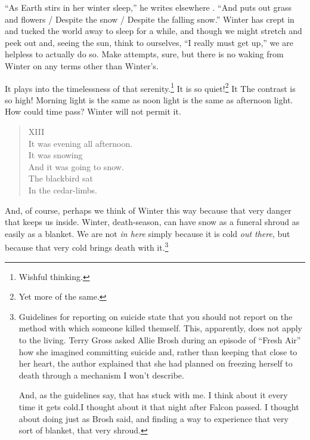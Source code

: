\documentclass[12pt,oneside]{memoir}
\begin{document}
``As Earth stirs in her winter sleep,'' he writes elsewhere \parencite[173]{graves_poems}. ``And puts out grass and flowers / Despite the snow / Despite the falling snow.'' Winter has crept in and tucked the world away to sleep for a while, and though we might stretch and peek out and, seeing the sun, think to ourselves, ``I really must get up,'' we are helpless to actually do so. Make attempts, sure, but there is no waking from Winter on any terms other than Winter's.

It plays into the timelessness of that serenity.\footnote{Wishful thinking.} It is so quiet!\footnote{Yet more of the same.} It The contrast is so high! Morning light is the same as noon light is the same as afternoon light. How could time pass? Winter will not permit it.

\begin{verse}
XIII \\
It was evening all afternoon. \\
It was snowing \\
And it was going to snow. \\
The blackbird sat \\
In the cedar-limbs.

\parencite{blackbird}
\end{verse}

And, of course, perhaps we think of Winter this way because that very danger that keeps us inside. Winter, death-season, can have snow as a funeral shroud as easily as a blanket. We are not \emph{in here} simply because it is cold \emph{out there}, but because that very cold brings death with it.\footnote{Guidelines for reporting on suicide state that you should not report on the method with which someone killed themself. This, apparently, does not apply to the living. Terry Gross asked Allie Brosh during an episode of ``Fresh Air'' how she imagined committing suicide and, rather than keeping that close to her heart, the author explained that she had planned on freezing herself to death through a mechanism I won't describe.\par And, as the guidelines say, that has stuck with me. I think about it every time it gets cold.\footnotemark I thought about it that night after Falcon passed. I thought about doing just as Brosh said, and finding a way to experience that very sort of blanket, that very shroud.}
\end{document}
